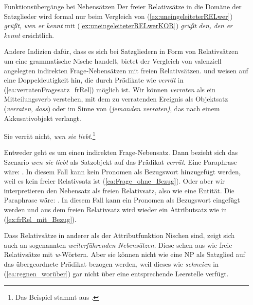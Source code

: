 \begin{Exkurs}{Funktionsübergänge bei Nebensätzen}
Der  freier Relativsätze in die Domäne der Satzglieder wird formal nur beim Vergleich von (\ref{ex:uneingeleiteterRELwer}) \textit{grüßt, wen er kennt} mit (\ref{ex:uneingeleiteterRELwerKOR}) \textit{grüßt den, den er kennt} ersichtlich. 

Andere Indizien dafür, dass es sich bei Satzgliedern in Form von Relativsätzen um eine grammatische Nische handelt, bietet der Vergleich von valenziell angelegten indirekten Frage-Nebensätzen mit freien Relativsätzen. \citet[346]{Eisenberg2020_Satz} und \citet[446--446]{Pittner2013} weisen auf eine Doppeldeutigkeit hin, die durch Prädikate wie \textit{verrät} in (\ref{ea:verratenFragesatz_frRel}) möglich ist. Wir können \textit{verraten} als ein Mitteilungsverb verstehen, mit dem zu verratenden Ereignis als Objektsatz (\textit{verraten}, \textit{dass}) oder im Sinne von  (\textit{jemanden verraten)}, das nach einem Akkusativobjekt verlangt.

\ea \label{ea:verratenFragesatz_frRel} Sie verrät nicht, \textit{wen sie liebt}.\footnote{Das Beispiel stammt aus \citet[447]{Pittner2013}.}
\z 

Entweder geht es um einen indirekten Frage-Nebensatz. Dann bezieht sich das Szenario \textit{wen sie liebt} als Satzobjekt auf das Prädikat \textit{verrät}. Eine Paraphrase wäre: . In diesem Fall kann kein Pronomen als Bezugswort hinzugefügt werden, weil es kein freier Relativsatz ist (\ref{ea:Frage_ohne_Bezug}). Oder aber wir interpretieren den Nebensatz als freien Relativsatz, also wie eine Entität. Die Paraphrase wäre: . In diesem Fall kann ein Pronomen als Bezugswort eingefügt werden und aus dem freien Relativsatz wird wieder ein Attributsatz wie in (\ref{ex:frRel_mit_Bezug}). 

\ea \label{ea:TestFrage_Relativ}
\label{ea:Frage_ohne_Bezug} 
\label{ex:frRel_mit_Bezug}
\z 
\z 

Dass Relativsätze in anderer als der Attributfunktion Nischen sind, zeigt sich auch an sogenannten \textit{weiterführenden Nebensätzen}. Diese sehen aus wie freie Relativsätze mit \textit{w}-Wörtern. Aber sie können nicht wie eine NP als Satzglied auf das übergeordnete Prädikat bezogen werden, weil dieses wie \textit{schneien} in (\ref{ea:regnen_worüber}) gar nicht über eine entsprechende Leerstelle verfügt.


\end{Exkurs}
